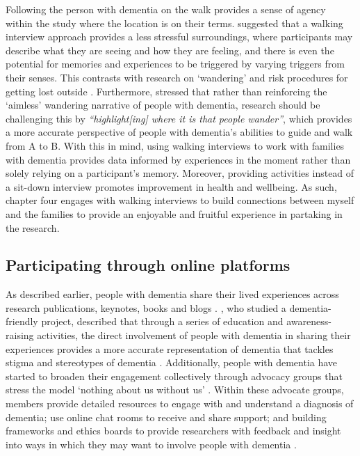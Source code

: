 Following the person with dementia on the walk provides a sense of agency within the study where the location is on their terms. \cite{kullberg2017walking}  suggested that a walking interview approach provides a less stressful surroundings, where participants may describe what they are seeing and how they are feeling, and there is even the potential for memories and experiences to be triggered by varying triggers from their senses. This contrasts with research on `wandering' and risk procedures for getting lost outside \citep{odzakovic2020verjoyed}. Furthermore, \cite{brittain2017walking} stressed that rather than reinforcing the `aimless' wandering narrative of people with dementia, research should be challenging this by \textit{``highlight[ing] where it is that people wander''}, which provides a more accurate perspective of people with dementia's abilities to guide and walk from A to B. With this in mind, using walking interviews to work with families with dementia provides data informed by experiences in the moment rather than solely relying on a participant's memory. Moreover, providing activities instead of a sit-down interview promotes improvement in health and wellbeing. As such, chapter four engages with walking interviews to build connections between myself and the families to provide an enjoyable and fruitful experience in partaking in the research.

\subsection{Participating through online platforms}
\label{PD:onlinePlatform}
As described earlier, people with dementia share their lived experiences across research publications, keynotes, books and blogs \citep{bryden_challenging_2020, shakespeare_rights_2019}. \cite{phillipson2019involvement}, who studied a dementia-friendly project, described that through a series of education and awareness-raising activities, the direct involvement of people with dementia in sharing their experiences provides a more accurate representation of dementia that tackles stigma and stereotypes of dementia \citep{herrmann_systematic_2018}. Additionally, people with dementia have started to broaden their engagement collectively through advocacy groups that stress the model `nothing about us without us' \citep{oldfield2021nothing}. Within these advocate groups, members provide detailed resources to engage with and understand a diagnosis of dementia; use online chat rooms to receive and share support; and building frameworks and ethics boards to provide researchers with feedback and insight into ways in which they may want to involve people with dementia \citep{davies2021dementia}.

